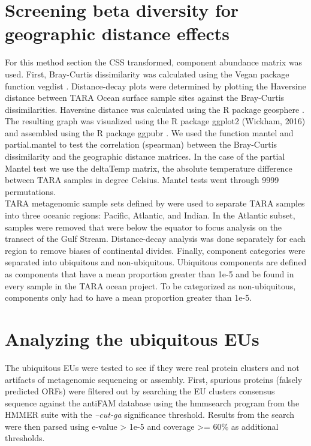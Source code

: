 \section{Screening beta diversity for geographic distance effects}

For this method section the CSS transformed, component abundance matrix was used. First, Bray-Curtis dissimilarity was calculated using the Vegan package function vegdist \citep{Oksanen_2017}. Distance-decay plots were determined by plotting the Haversine distance between TARA Ocean surface sample sites against the Bray-Curtis dissimilarities. Haversine distance was calculated using the R package geosphere \citep{Hijmans_2017}. The resulting graph was visualized using the R package ggplot2 (Wickham, 2016) and assembled using the R package ggpubr \citep{Kassambara_2017}. We used the function mantel and partial.mantel to test the correlation (spearman) between the Bray-Curtis dissimilarity and the geographic distance matrices. In the case of the partial Mantel test we use the deltaTemp matrix, the absolute temperature difference between TARA samples in degree Celsius. Mantel tests went through 9999 permutations.\\

TARA metagenomic sample sets defined by \cite{Delmont_2017} were used to separate TARA samples into three oceanic regions: Pacific, Atlantic, and Indian. In the Atlantic subset, samples were removed that were below the equator to focus analysis on the transect of the Gulf Stream. Distance-decay analysis was done separately for each region to remove biases of continental divides. Finally, component categories were separated into ubiquitous and non-ubiquitous. Ubiquitous components are defined as components that have a mean proportion greater than 1e-5 and be found in every sample in the TARA ocean project. To be categorized as non-ubiquitous, components only had to have a mean proportion greater than 1e-5.\\

\section{Analyzing the ubiquitous EUs}

The ubiquitous EUs were tested to see if they were real protein clusters and not artifacts of metagenomic sequencing or assembly. First, spurious proteins (falsely predicted ORFs) were filtered out by searching the EU clusters consensus sequence against the antiFAM database \citep{Eberhardt_2012} using the hmmsearch program from the HMMER suite \citep{Eddy_1998} with the \textit{--cut-ga} significance threshold. Results from the search were then parsed using e-value > 1e-5 and coverage >= 60\% as additional thresholds.\\

